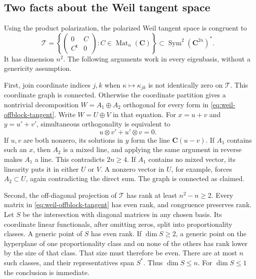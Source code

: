 \subsection{Two facts about the Weil tangent space}

Using the product polarization, the polarized Weil tangent space
is congruent to
\begin{equation}
 \mathcal T=
 \left\{\begin{pmatrix}0&C\\C^{\mathsf t}&0\end{pmatrix}:
                    C\in\operatorname{Mat}_n(\mathbf C)\right\}
 \subset\operatorname{Sym}^2(\mathbf C^{2n})^*.
 \label{eq:weil-offblock-tangent}
\end{equation}
It has dimension $n^2$.  The following arguments work in every
eigenbasis, without a genericity assumption.

First, join coordinate indices $j,k$ when
$\kappa\mapsto\kappa_{jk}$ is not identically zero on $\mathcal T$.
This coordinate graph is connected.  Otherwise the coordinate
partition gives a nontrivial decomposition $W=A_1\oplus A_2$
orthogonal for every form in \eqref{eq:weil-offblock-tangent}.
Write $W=U\oplus V$ in that equation.  For $x=u+v$ and
$y=u'+v'$, simultaneous orthogonality is equivalent to
\[
 u\otimes v'+u'\otimes v=0.
\]
If $u,v$ are both nonzero, its solutions in $y$ form the line
$\mathbf C(u-v)$.  If $A_1$ contains such an $x$, then $A_2$ is
a mixed line, and applying the same argument in reverse makes
$A_1$ a line.  This contradicts $2n\ge4$.
If $A_1$ contains no mixed vector, its linearity puts it in either
$U$ or $V$.  A nonzero vector in $U$, for example, forces
$A_2\subset U$, again contradicting the direct sum.  The graph
is connected as claimed.

Second, the off-diagonal projection of $\mathcal T$ has rank at
least $n^2-n\ge2$.  Every matrix in
\eqref{eq:weil-offblock-tangent} has even rank, and congruence
preserves rank.  Let $S$ be the intersection with diagonal
matrices in any chosen basis.  Its coordinate linear functionals,
after omitting zeros, split into proportionality classes.
A generic point of $S$ has even rank.  If $\dim S\ge2$, a generic
point on the hyperplane of one proportionality class and on none
of the others has rank lower by the size of that class.  That size
must therefore be even.  There are at most $n$ such classes,
and their representatives span $S^*$.  Thus $\dim S\le n$.
For $\dim S\le1$ the conclusion is immediate.

